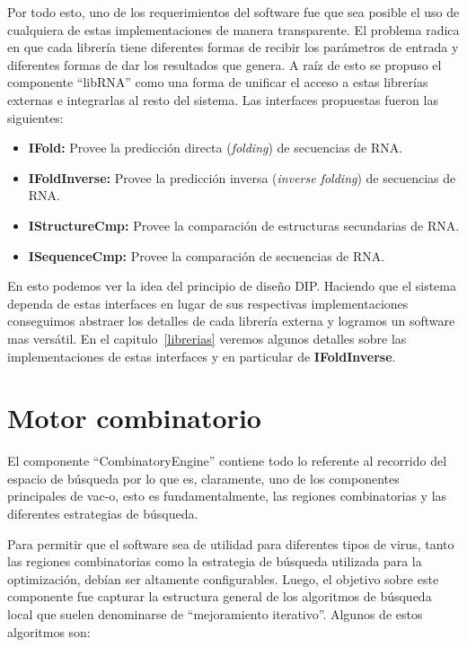 Por todo esto, uno de los requerimientos del software fue que sea posible el uso
de cualquiera de estas implementaciones de manera transparente. El problema
radica en que cada librer\'ia tiene diferentes formas de recibir los
par\'ametros de entrada y diferentes formas de dar los resultados que genera. A
ra\'iz de esto se propuso el componente ``libRNA'' como una forma de unificar el
acceso a estas librer\'ias externas e integrarlas al resto del sistema. Las
interfaces propuestas fueron las siguientes:

\begin{itemize}
 \item \textbf{IFold:} Provee la predicci\'on directa (\textit{folding})
de secuencias de \ac{RNA}.
 \item \textbf{IFoldInverse:} Provee la predicci\'on inversa (\textit{inverse
folding}) de secuencias de \ac{RNA}.
 \item \textbf{IStructureCmp:} Provee la comparaci\'on de estructuras
secundarias
de \ac{RNA}.
 \item \textbf{ISequenceCmp:} Provee la comparaci\'on de secuencias de
\ac{RNA}.
\end{itemize}

En esto podemos ver la idea del principio de dise\~no \ac{DIP}. Haciendo que el
sistema dependa de estas interfaces en lugar de sus respectivas
implementaciones conseguimos abstraer los detalles de cada librer\'ia externa y
logramos un software mas vers\'atil. En el capitulo~\ref{librerias} veremos
algunos detalles sobre las implementaciones de estas interfaces y en particular
de \textbf{IFoldInverse}.

\section{Motor combinatorio}
\label{diseno-motor}
El componente ``CombinatoryEngine'' contiene todo lo referente al recorrido del
espacio de b\'usqueda por lo que es, claramente, uno de los componentes
principales de \ac{vac-o}, esto es fundamentalmente, las regiones
combinatorias y las diferentes estrategias de b\'usqueda.

Para permitir que el software sea de utilidad para diferentes tipos de virus,
tanto las regiones combinatorias como la estrategia de b\'usqueda utilizada
para la optimizaci\'on, deb\'ian ser altamente configurables. Luego, el
objetivo sobre este componente fue capturar la estructura general de los
algoritmos de b\'usqueda local que suelen denominarse de ``mejoramiento
iterativo''. Algunos de estos algoritmos son:

